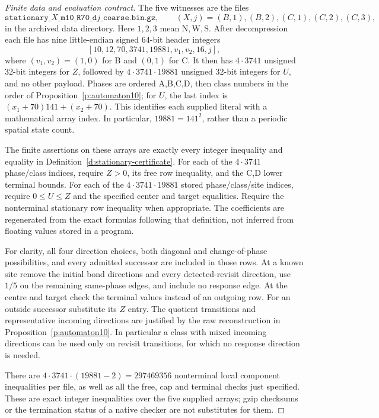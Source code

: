 \begin{proof}[Finite data and evaluation contract]
The five witnesses are the files
\[
 \texttt{stationary\_}\!X\texttt{\_m10\_R70\_d}j
                  \texttt{\_coarse.bin.gz},
 \qquad (X,j)=(B,1),(B,2),(C,1),(C,2),(C,3),
\]
in the archived data directory. Here \(1,2,3\) mean
\(\mathrm N,\mathrm W,\mathrm S\). After decompression each file
has nine little-endian signed 64-bit header integers
\[
 [10,12,70,3741,19881,v_1,v_2,16,j],
\]
where \((v_1,v_2)=(1,0)\) for B and \((0,1)\) for C.
It then has \(4\cdot3741\) unsigned 32-bit integers for \(Z\),
followed by \(4\cdot3741\cdot19881\) unsigned 32-bit integers
for \(U\), and no other payload. Phases are ordered A,B,C,D,
then class numbers in the order of
Proposition~\ref{p:automaton10}; for \(U\), the last index is
\((x_1+70)141+(x_2+70)\). This identifies each supplied literal
with a mathematical array index. In particular,
\(19881=141^2\), rather than a periodic spatial state count.

The finite assertions on these arrays are exactly every integer
inequality and equality in Definition~\ref{d:stationary-certificate}.
For each of the \(4\cdot3741\) phase/class indices, require
\(Z>0\), its free row inequality, and the C,D lower terminal
bounds. 
For each of the \(4\cdot3741\cdot19881\) stored
phase/class/site indices, require \(0\le U\le Z\) and the specified
center and target equalities. 
Require the nonterminal stationary row inequality when appropriate.
The coefficients are regenerated
from the exact formulas following that definition, not inferred
from floating values stored in a program.

For clarity, all four direction choices, both diagonal and
change-of-phase possibilities, and every admitted successor are
included in those rows. At a known site remove the initial bond
directions and every detected-revisit direction, use \(1/5\) on
the remaining same-phase edges, and include no response edge.
At the centre and target check the terminal values instead of an
outgoing row. For an outside successor substitute its \(Z\) entry.
The quotient transitions and representative incoming directions
are justified by the raw reconstruction in
Proposition~\ref{p:automaton10}. In particular a class with mixed
incoming directions can be used only on revisit transitions, for
which no response direction is needed.

There are \(4\cdot3741\cdot(19881-2)=297469356\) nonterminal
local component inequalities per file, as well as all the free,
cap and terminal checks just specified. These are exact integer
inequalities over the five supplied arrays; gzip checksums or the
termination status of a native checker are not substitutes for them.


\end{proof}
